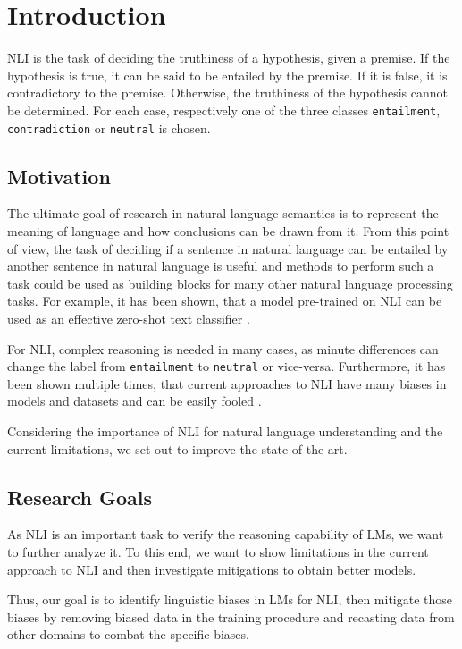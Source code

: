 \section{Introduction}


\ac{NLI} is the task of deciding the truthiness of a hypothesis, given a premise. If the hypothesis is true, it can be said to be entailed by the premise. If it is false, it is contradictory to the premise. Otherwise, the truthiness of the hypothesis cannot be determined. For each case, respectively one of the three classes \texttt{entailment}, \texttt{contradiction} or \texttt{neutral} is chosen.

\subsection{Motivation}
The ultimate goal of research in natural language semantics is to represent the meaning of language and how conclusions can be drawn from it. From this point of view, the task of deciding if a sentence in natural language can be entailed by another sentence in natural language is useful and methods to perform such a task could be used as building blocks for many other natural language processing tasks. For example, it has been shown, that a model pre-trained on \ac{NLI} can be used as an effective zero-shot text classifier \cite{yin-etal-2019-benchmarking}.

For \ac{NLI}, complex reasoning is needed in many cases, as minute differences can change the label from \texttt{entailment} to \texttt{neutral} or vice-versa. Furthermore, it has been shown multiple times, that current approaches to \ac{NLI} have many biases in models and datasets and can be easily fooled \cite{hyponly,gururangan-etal-2018-annotation,glockner-etal-2018-breaking}.

Considering the importance of \ac{NLI} for natural language understanding and the current limitations, we set out to improve the state of the art.
\subsection{Research Goals}
As \ac{NLI} is an important task to verify the reasoning capability of \acp{LM}, we want to further analyze it. To this end, we want to show limitations in the current approach to \ac{NLI} and then investigate mitigations to obtain better models.

Thus, our goal is to identify linguistic biases in \acp{LM} for \ac{NLI}, then mitigate those biases by removing biased data in the training procedure and recasting data from other domains to combat the specific biases.
\vspace{1em}

